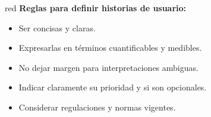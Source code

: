 \begin{consigna}{red}
\textbf{Reglas para definir historias de usuario:}
\begin{itemize}
  \item Ser concisas y claras.
  \item Expresarlas en términos cuantificables y medibles.
  \item No dejar margen para interpretaciones ambiguas.
  \item Indicar claramente su prioridad y si son opcionales.
  \item Considerar regulaciones y normas vigentes.
\end{itemize}
\end{consigna}
